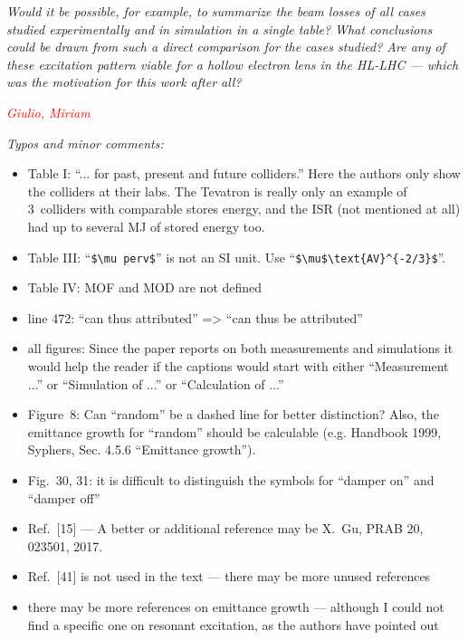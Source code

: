 \documentclass[aps
,prstab
,preprint,tightenlines
,amsfonts,amssymb,amsmath
]{revtex4-1}
\newcommand{\note}[1]{\emph{\textcolor{red}{#1}}} %
\newenvironment{co}{\em}{}
\newcommand{\bco}{\begin{co}}
\newcommand{\eco}{\end{co}}
\begin{document}
\bco
Would it be possible, for example, to summarize the beam losses of all
cases studied experimentally and in simulation in a single table? What
conclusions could be drawn from such a direct comparison for the cases
studied? Are any of these excitation pattern viable for a hollow
electron lens in the HL-LHC --- which was the motivation for this work
after all?
\eco

\note{Giulio, Miriam}

\bco
Typos and minor comments: 

\begin{itemize}

\item Table I: ``... for past, present and future colliders.'' Here the 
authors only show the colliders at their labs. The Tevatron is really 
only an example of 3~colliders with comparable stores energy, and the 
ISR (not mentioned at all) had up to several MJ of stored energy too. 

\item Table III: ``\verb!$\mu perv$!'' is not an SI unit. Use 
``\verb!$\mu$\text{AV}^{-2/3}$!''. 

\item Table IV: MOF and MOD are not defined 

\item line 472: ``can thus attributed'' => ``can thus be attributed'' 

\item all figures: Since the paper reports on both measurements and 
simulations it would help the reader if the captions would start with 
either ``Measurement ...'' or ``Simulation of ...'' or ``Calculation of 
...'' 

\item Figure~8: Can ``random'' be a dashed line for better distinction? 
Also, the emittance growth for ``random'' should be calculable (e.g. 
Handbook 1999, Syphers, Sec. 4.5.6 ``Emittance growth''). 

\item Fig.~30, 31: it is difficult to distinguish the symbols for ``damper 
on'' and ``damper off'' 

\item Ref.~[15] --- A better or additional reference may be X.~Gu, PRAB 20, 
023501, 2017. 

\item Ref.~[41] is not used in the text --- there may be more unused 
references 

\item there may be more references on emittance growth --- although I could 
not find a specific one on resonant excitation, as the authors have 
pointed out

\end{itemize}
\eco
\end{document}
